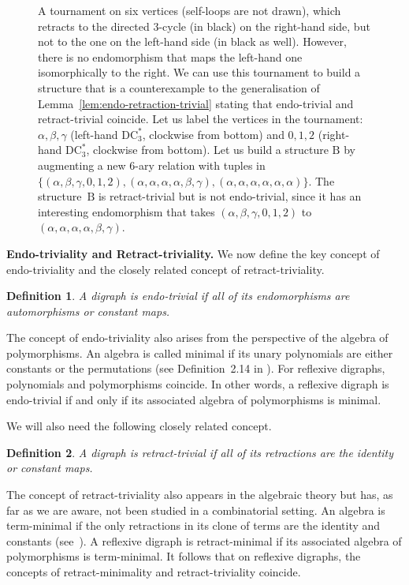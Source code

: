 \documentclass[a4paper,12pt]{article}
\newtheorem{definition}{Definition}
\theoremstyle{remark}
\newcommand{\DC}[0]{\ensuremath{\mathrm{DC}}}
\newcommand{\B}{\ensuremath{\mathrm{B}}}
\begin{document}
\begin{figure}
\caption{A tournament on six vertices (self-loops are not drawn), which retracts to the directed 3-cycle (in black) on the right-hand side, but not to the one on the left-hand side (in black as well). However, there is no endomorphism that maps the left-hand one isomorphically to the right. We can use this tournament to build a structure that is a counterexample to the generalisation of Lemma~\ref{lem:endo-retraction-trivial} stating that endo-trivial and retract-trivial coincide. Let us label the vertices in the tournament: $\alpha,\beta,\gamma$ (left-hand $\DC^*_3$, clockwise from bottom) and $0,1,2$ (right-hand $\DC^*_3$, clockwise from bottom). Let us build a structure $\B$ by augmenting a new $6$-ary relation with tuples in $\{(\alpha,\beta,\gamma,0,1,2),(\alpha,\alpha,\alpha,\alpha,\beta,\gamma),(\alpha,\alpha,\alpha,\alpha,\alpha,\alpha)\}$. 
The structure~$\B$ is retract-trivial but is not endo-trivial, since it has an interesting endomorphism that takes $(\alpha,\beta,\gamma,0,1,2)$ to $(\alpha,\alpha,\alpha,\alpha,\beta,\gamma)$.}
\label{fig:Tournament6}
\end{figure}

\medskip
\noindent
{\bf Endo-triviality and Retract-triviality.}
We now define the key concept of endo-triviality and the closely related concept of retract-triviality.

\begin{definition}
A digraph is \emph{endo-trivial} if all of its endomorphisms are automorphisms or constant maps. 
\end{definition}

\noindent The concept of endo-triviality also arises from the perspective of the algebra of polymorphisms. An algebra is called minimal if its unary polynomials are either constants or the permutations (see Definition~2.14 in \cite{HobbyMcKenzie}). For reflexive digraphs,
polynomials and polymorphisms coincide. 
In other words, a reflexive digraph is endo-trivial if and only if its associated algebra of polymorphisms is minimal.

We will also need the following closely related concept.

\begin{definition}
A digraph is \emph{retract-trivial} if all of its retractions are the identity or constant maps.
\end{definition}

\noindent The concept of retract-triviality also appears in the algebraic theory but has, as far as we are aware, not been studied in a combinatorial setting. An algebra is term-minimal if the only retractions in its clone of terms are the identity and constants (see~\cite{TermMinimalAlgebras}). A reflexive digraph is retract-minimal if its associated algebra of polymorphisms is term-minimal. It follows that on reflexive digraphs, the concepts of retract-minimality and retract-triviality coincide.
\end{document}
